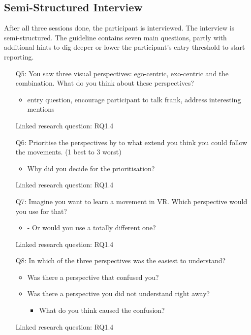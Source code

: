 \subsection{Semi-Structured Interview}
After all three sessions done, the participant is interviewed. The interview is semi-structured. The guideline contains seven main questions, partly with additional hints to dig deeper or lower the participant's entry threshold to start reporting.
\begin{itemize}
	\item[Q5:] You saw three visual perspectives: ego-centric, exo-centric and the combination. What do you think about these perspectives?
	\begin{itemize}
		\item entry question, encourage participant to talk frank, address interesting mentions
	\end{itemize}
	\item[] Linked research question: RQ1.4
	
	\item[Q6:] Prioritise the perspectives by to what extend you think you could follow the movements. (1 best to 3 worst) 	
	\begin{itemize}
		\item Why did you decide for the prioritisation?
	\end{itemize}
	\item[] Linked research question: RQ1.4
	
	\item[Q7:] Imagine you want to learn a movement in VR. Which perspective would you use for that?
	\begin{itemize}
		\item -	Or would you use a totally different one?
	\end{itemize}
	\item[] Linked research question: RQ1.4
	
	\item[Q8:] In which of the three perspectives was the easiest to understand? 
	\begin{itemize}
		\item Was there a perspective that confused you?
		\item Was there a perspective you did not understand right away?
		\begin{itemize}
			\item What do you think caused the confusion?
		\end{itemize}
	\end{itemize}
	\item[] Linked research question: RQ1.4
	

\end{itemize}

